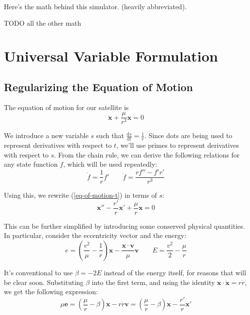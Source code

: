 \documentclass{article}
\newcommand{\dd}{\mathrm{d}}
\newcommand{\der}[2]{\frac{\dd #1}{\dd #2}}
\numberwithin{equation}{subsection}
\begin{document}
Here's the math behind this simulator. (heavily abbreviated).

TODO all the other math

\section{Universal Variable Formulation}

\subsection{Regularizing the Equation of Motion}

The equation of motion for our satellite is
\begin{equation}
\label{eq-of-motion-t}
\ddot{\bm x} + \frac{\mu}{r^3} \bm x = 0
\end{equation}

We introduce a new variable $s$ such that $\der{s}{t} = \frac{1}{r}$. Since dots are being used to represent derivatives with respect to $t$, we'll use primes to represent derivatives with respect to $s$. From the chain rule, we can derive the following relations for any state function $f$, which will be used repeatedly:
\begin{equation}
\label{s-and-t-derivatives}
\dot f = \frac{1}{r} f' \qquad \ddot f = \frac{r f'' - f' r'}{r^3}
\end{equation}

Using this, we rewrite (\ref{eq-of-motion-t}) in terms of $s$:
\begin{equation}
\label{eq-of-motion-s}
\bm x'' - \frac{r'}{r} \bm x' + \frac{\mu}{r} \bm x = 0
\end{equation}

This can be further simplified by introducing some conserved physical quantities. In particular, consider the eccentricity vector and the energy:
\begin{equation}
\label{eccentricity-and-energy}
e = \left( \frac{v^2}{\mu} - \frac{1}{r} \right) \bm x - \frac{\bm x \cdot \bm v}{\mu} \bm v \qquad E = \frac{v^2}{2} - \frac{\mu}{r}
\end{equation}

It's conventional to use $\beta = -2E$ instead of the energy itself, for reasons that will be clear soon. Substituting $\beta$ into the first term, and using the identity $\bm x \cdot \dot{\bm x} = r \dot{r}$, we get the following expression:
\begin{equation}
\label{mu-e}
\mu \bm e = \left( \frac{\mu}{r} - \beta \right) \bm x - r \dot{r} \bm v = \left( \frac{\mu}{r} - \beta \right) \bm x - \frac{r'}{r} \bm x'
\end{equation}
\end{document}
